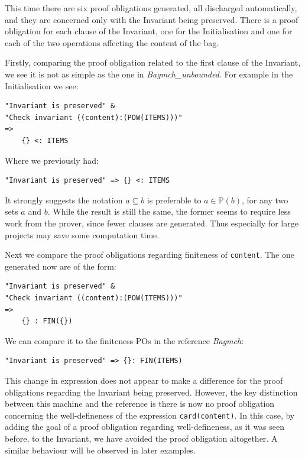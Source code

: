 \documentclass[12pt,journal,duplex]{IEEEtran}
\begin{document}
	This time there are six proof obligations generated, all discharged automatically, and they are concerned only with the Invariant being preserved. There is a proof obligation for each clause of the Invariant, one for the Initialisation and one for each of the two operations affecting the content of the bag.

	Firstly, comparing the proof obligation related to the first clause of the Invariant, we see it is not as simple as the one in \emph{Bagmch\_unbounded}. For example in the Initialisation we see:

	\begin{lstlisting}
"Invariant is preserved" &
"Check invariant ((content):(POW(ITEMS)))"
=>
	{} <: ITEMS
	\end{lstlisting}

	Where we previously had:
	\begin{lstlisting}
"Invariant is preserved" => {} <: ITEMS
	\end{lstlisting}

	It strongly suggests the notation $a \subseteq b$ is preferable to $a \in \mathbb{P}(b)$, for any two sets $a$ and $b$. While the result is still the same, the former seems to require less work from the prover, since fewer clauses are generated. Thus especially for large projects may save some computation time.

	Next we compare the proof obligations regarding finiteness of \texttt{content}. The one generated now are of the form:

	\begin{lstlisting}
"Invariant is preserved" &
"Check invariant ((content):(POW(ITEMS)))"
=>
	{} : FIN({})
	\end{lstlisting}

	We can compare it to the finiteness POs in the reference \emph{Bagmch}:

	\begin{lstlisting}
"Invariant is preserved" => {}: FIN(ITEMS)
	\end{lstlisting}

	This change in expression does not appear to make a difference for the proof obligations regarding the Invariant being preserved. However, the key distinction between this machine and the reference is there is now no proof obligation concerning the well-defineness of the expression \texttt{card(content)}. In this case, by adding the goal of a proof obligation regarding well-defineness, as it was seen before, to the Invariant, we have avoided the proof obligation altogether. A similar behaviour will be observed in later examples.
\end{document}
